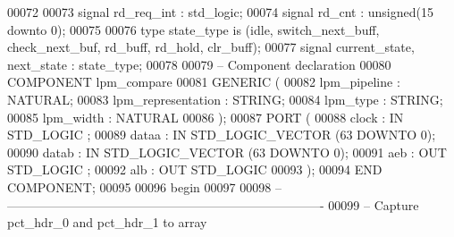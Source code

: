 \begin{DoxyCode}
00072 
00073 \textcolor{keywordflow}{signal} \textcolor{vhdlchar}{rd_req_int}                   \textcolor{vhdlchar}{:} \textcolor{comment}{std\_logic};
00074 \textcolor{keywordflow}{signal} \textcolor{vhdlchar}{rd_cnt}                       \textcolor{vhdlchar}{:} \textcolor{comment}{unsigned}\textcolor{vhdlchar}{(}\textcolor{vhdllogic}{}\textcolor{vhdllogic}{15} \textcolor{keywordflow}{downto} \textcolor{vhdllogic}{}\textcolor{vhdllogic}{0}\textcolor{vhdlchar}{)};
00075 
00076 \textcolor{keywordflow}{type} \textcolor{vhdlchar}{state_type} \textcolor{keywordflow}{is} \textcolor{vhdlchar}{(}\textcolor{vhdlchar}{idle}\textcolor{vhdlchar}{,} \textcolor{vhdlchar}{switch\_next\_buff}\textcolor{vhdlchar}{,} \textcolor{vhdlchar}{check\_next\_buf}\textcolor{vhdlchar}{,} \textcolor{vhdlchar}{rd\_buff}\textcolor{vhdlchar}{,} \textcolor{vhdlchar}{rd\_hold}\textcolor{vhdlchar}{,} \textcolor{vhdlchar}{clr\_buff}\textcolor{vhdlchar}{)};
00077 \textcolor{keywordflow}{signal} \textcolor{vhdlchar}{current_state}\textcolor{vhdlchar}{,} \textcolor{vhdlchar}{next_state} \textcolor{vhdlchar}{:} \textcolor{vhdlchar}{state_type};   
00078 
00079 \textcolor{keyword}{-- Component declaration}
00080 \textcolor{keywordflow}{COMPONENT} lpm\_compare
00081    \textcolor{keywordflow}{GENERIC} (
00082       lpm\_pipeline         : \textcolor{comment}{NATURAL};
00083       lpm\_representation   : \textcolor{comment}{STRING};
00084       lpm\_type             : \textcolor{comment}{STRING};
00085       lpm\_width            : \textcolor{comment}{NATURAL}
00086    );
00087    \textcolor{keywordflow}{PORT} (
00088       clock : \textcolor{keywordflow}{IN} \textcolor{comment}{STD\_LOGIC} ;
00089       dataa : \textcolor{keywordflow}{IN} \textcolor{comment}{STD\_LOGIC\_VECTOR} (\textcolor{vhdllogic}{}\textcolor{vhdllogic}{63} \textcolor{keywordflow}{DOWNTO} \textcolor{vhdllogic}{}\textcolor{vhdllogic}{0});
00090       datab : \textcolor{keywordflow}{IN} \textcolor{comment}{STD\_LOGIC\_VECTOR} (\textcolor{vhdllogic}{}\textcolor{vhdllogic}{63} \textcolor{keywordflow}{DOWNTO} \textcolor{vhdllogic}{}\textcolor{vhdllogic}{0});
00091       aeb   : \textcolor{keywordflow}{OUT} \textcolor{comment}{STD\_LOGIC} ;
00092       alb   : \textcolor{keywordflow}{OUT} \textcolor{comment}{STD\_LOGIC} 
00093    );
00094    \textcolor{keywordflow}{END} \textcolor{keywordflow}{COMPONENT};
00095 
00096 \textcolor{vhdlkeyword}{begin}
00097    
00098 \textcolor{keyword}{-- ----------------------------------------------------------------------------}
00099 \textcolor{keyword}{-- Capture pct\_hdr\_0 and pct\_hdr\_1 to array}

\end{DoxyCode}
